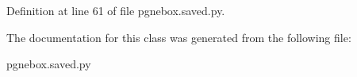 Definition at line 61 of file pgnebox.\+saved.\+py.



The documentation for this class was generated from the following file\+:\begin{DoxyCompactItemize}
\item 
pgnebox.\+saved.\+py\end{DoxyCompactItemize}
